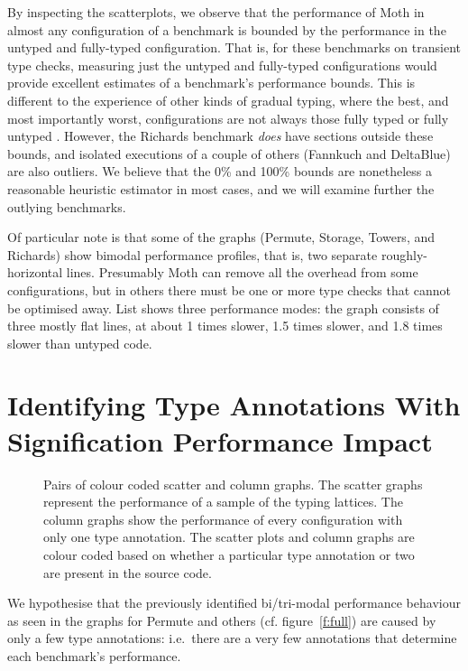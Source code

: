 \documentclass[sigplan,screen]{acmart}
\begin{document}
By inspecting the scatterplots, we observe that the performance of
Moth in almost any configuration of a benchmark is bounded by
the performance in the untyped and fully-typed configuration.
That is, for these benchmarks on transient type checks,
measuring just the untyped and fully-typed configurations
would provide excellent estimates of a benchmark's
performance bounds.  This is different to the experience
of other kinds of gradual typing, where the best, and most
importantly worst, configurations are not always those
fully typed or fully untyped \cite{Greenman2019jfp}.
%
However, the Richards benchmark \textit{does} have
sections outside these bounds, and isolated executions of
a couple of others (Fannkuch and DeltaBlue) are also outliers.
%
We believe that the 0\% and 100\% bounds are nonetheless a
reasonable heuristic estimator in most cases, and we will
examine further the outlying benchmarks.


Of particular note is that some of the graphs (Permute, Storage, Towers, and Richards) show bimodal performance profiles, that is, two separate roughly-horizontal lines. Presumably Moth can remove all the overhead from some configurations, but in others there must be one or more type checks that cannot be optimised away. List shows three performance modes: the graph consists of three mostly flat lines, at about 1 times slower, 1.5 times slower, and 1.8 times slower than untyped code.



\section{Identifying Type Annotations With Signification Performance Impact}
\label{s-individual}
\begin{figure*}
	
	\caption{Pairs of colour coded scatter and column graphs. The scatter graphs represent the performance of a sample of the typing lattices. The column graphs show the performance of every configuration with only one type annotation. The scatter plots and column graphs are colour coded based on whether a particular type annotation or two are present in the source code.}
	\label{f:pattern}		
\end{figure*}

We hypothesise that the previously identified bi/tri-modal performance behaviour
as seen in the graphs for Permute and others (cf. figure~\ref{f:full}) are caused by only a few type annotations: i.e.\ there are a very few annotations that determine each benchmark's performance.
\end{document}
